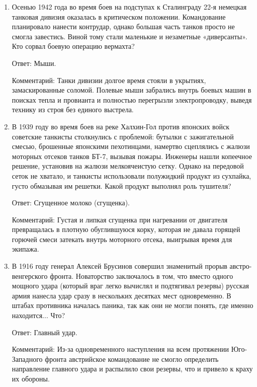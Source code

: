 \documentclass[oneside,final,14pt]{extreport}
\begin{document}
\begin{enumerate}
    Ответ: егерь/егеря

    Комментарий. Ответ - егеря, от немецкого Jäger — охотник. 17 егерский полк под  командованием полковника Корягина и майора Котляревского две недели сражался с  персами, почти без еды и воды, в ужасную жару и засуху.

    \item Осенью 1942 года во время боев на подступах к Сталинграду 22-я немецкая танковая дивизия оказалась в критическом положении. Командование планировало нанести контрудар, однако большая часть танков просто не смогла завестись. Виной тому стали маленькие и незаметные «диверсанты». Кто сорвал боевую операцию вермахта?


    Ответ: Мыши.

    Комментарий: Танки дивизии долгое время стояли в укрытиях, замаскированные соломой. Полевые мыши забрались внутрь боевых машин в поисках тепла и провианта и полностью перегрызли электропроводку, выведя технику из строя без единого выстрела.

    \item В 1939 году во время боев на реке Халхин-Гол против японских войск советские танкисты столкнулись с проблемой: бутылки с зажигательной смесью, брошенные японскими пехотинцами, намертво сцеплялись с жалюзи моторных отсеков танков БТ-7, вызывая пожары. Инженеры нашли копеечное решение, установив на жалюзи мелкоячеистую сетку. Однако на передовой сеток не хватало, и танкисты использовали полужидкий продукт из сухпайка, густо обмазывая им решетки. Какой продукт выполнял роль тушителя?

    Ответ: Сгущенное молоко (сгущенка).

    Комментарий: Густая и липкая сгущенка при нагревании от двигателя превращалась в плотную обуглившуюся корку, которая не давала горящей горючей смеси затекать внутрь моторного отсека, выигрывая время для экипажа.

    \item В 1916 году генерал Алексей Брусинов совершил знаменитый прорыв австро-венгерского фронта. Новаторство заключалось в том, что вместо одного мощного удара (который враг легко вычислял и подтягивал резервы) русская армия нанесла удар сразу в нескольких десятках мест одновременно. В штабах противника началась паника, так как они не могли понять, где именно находится... Что?

    Ответ: Главный удар.

    Комментарий: Из-за одновременного наступления на всем протяжении Юго-Западного фронта австрийское командование не смогло определить направление главного удара и распылило свои резервы, что и привело к краху их обороны.


\end{enumerate}
\end{document}
